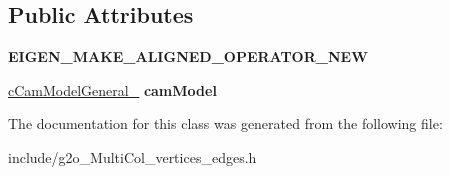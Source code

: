 \subsection*{Public Attributes}
\begin{DoxyCompactItemize}
\item 
{\bfseries E\+I\+G\+E\+N\+\_\+\+M\+A\+K\+E\+\_\+\+A\+L\+I\+G\+N\+E\+D\+\_\+\+O\+P\+E\+R\+A\+T\+O\+R\+\_\+\+N\+EW}\hypertarget{classMultiColSLAM_1_1VertexOmniCameraParameters_a2bfa28f2c03ee89f1a1a44e62787b5f5}{}\label{classMultiColSLAM_1_1VertexOmniCameraParameters_a2bfa28f2c03ee89f1a1a44e62787b5f5}

\item 
\hyperlink{classMultiColSLAM_1_1cCamModelGeneral__}{c\+Cam\+Model\+General\+\_\+} {\bfseries cam\+Model}\hypertarget{classMultiColSLAM_1_1VertexOmniCameraParameters_af64ebab6fa8ce6e44e8e09a737d11571}{}\label{classMultiColSLAM_1_1VertexOmniCameraParameters_af64ebab6fa8ce6e44e8e09a737d11571}

\end{DoxyCompactItemize}


The documentation for this class was generated from the following file\+:\begin{DoxyCompactItemize}
\item 
include/g2o\+\_\+\+Multi\+Col\+\_\+vertices\+\_\+edges.\+h\end{DoxyCompactItemize}
